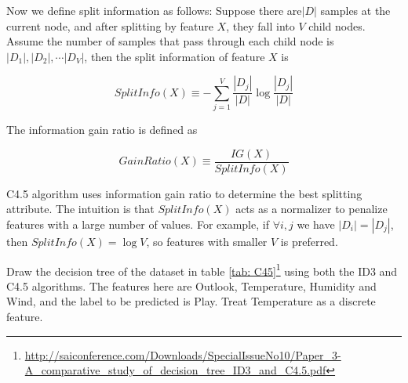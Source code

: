 Now we define split information as follows: Suppose there are$|D|$ samples at the current node, and after splitting by feature $X$, they fall into $V$ child nodes. Assume the number of samples that pass through each child node is $|D_1|, |D_2|, \cdots |D_V|$, then the split information of feature $X$ is

$$
SplitInfo(X) \equiv - \sum_{j=1}^V \frac{|D_j|}{|D|} \log \frac{|D_j|}{|D|}
$$

The information gain ratio is defined as 

$$
GainRatio(X) \equiv \frac{IG(X)}{SplitInfo(X)}
$$

C4.5 algorithm uses information gain ratio to determine the best splitting attribute. The intuition is that $SplitInfo(X)$ acts as a normalizer to penalize features with a large number of values. For example, if $\forall i,j$ we have $|D_i| = |D_j|$, then $SplitInfo(X)=\log V$, so features with smaller $V$ is preferred. 

Draw the decision tree of the dataset in table \ref{tab: C45}\footnote{\url{http://saiconference.com/Downloads/SpecialIssueNo10/Paper_3-A_comparative_study_of_decision_tree_ID3_and_C4.5.pdf}} using both the ID3 and C4.5 algorithms. The features here are Outlook, Temperature, Humidity and Wind, and the label to be predicted is Play. Treat Temperature as a discrete feature.